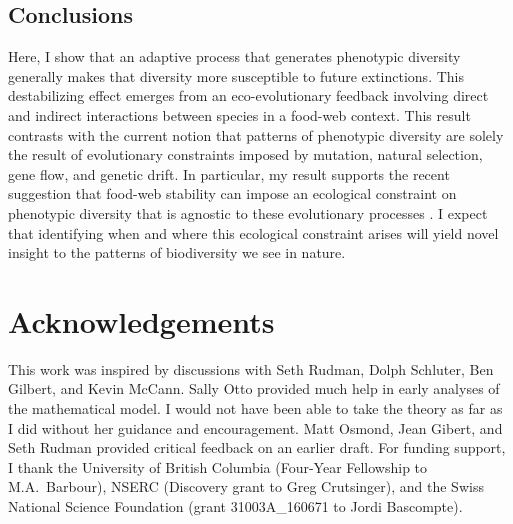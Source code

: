 \documentclass[11pt,]{article}
\begin{document}
\subsection{Conclusions}\label{conclusions}

Here, I show that an adaptive process that generates phenotypic
diversity generally makes that diversity more susceptible to future
extinctions. This destabilizing effect emerges from an eco-evolutionary
feedback involving direct and indirect interactions between species in a
food-web context. This result contrasts with the current notion that
patterns of phenotypic diversity are solely the result of evolutionary
constraints imposed by mutation, natural selection, gene flow, and
genetic drift. In particular, my result supports the recent suggestion
that food-web stability can impose an ecological constraint on
phenotypic diversity that is agnostic to these evolutionary processes
\citep{Borrelli2015b}. I expect that identifying when and where this
ecological constraint arises will yield novel insight to the patterns of
biodiversity we see in nature.

\section{Acknowledgements}\label{acknowledgements}

This work was inspired by discussions with Seth Rudman, Dolph Schluter,
Ben Gilbert, and Kevin McCann. Sally Otto provided much help in early
analyses of the mathematical model. I would not have been able to take
the theory as far as I did without her guidance and encouragement. Matt
Osmond, Jean Gibert, and Seth Rudman provided critical feedback on an
earlier draft. For funding support, I thank the University of British
Columbia (Four-Year Fellowship to M.A.~Barbour), NSERC (Discovery grant
to Greg Crutsinger), and the Swiss National Science Foundation (grant
31003A\_160671 to Jordi Bascompte).


\end{document}
